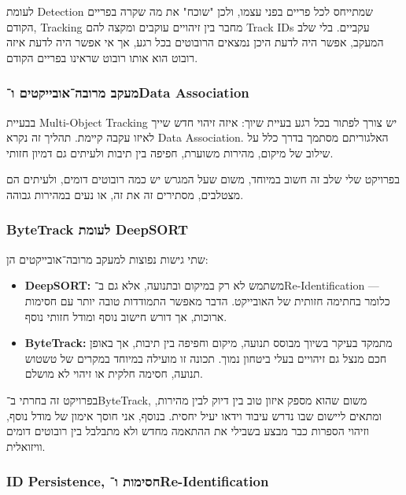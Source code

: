 לעומת \textenglish{Detection} שמתייחס לכל פריים בפני עצמו, ולכן "שוכח" את מה
שקרה בפריים הקודם, \textenglish{Tracking} מחבר בין זיהויים
עוקבים ומקצה להם \textenglish{Track IDs} עקביים. בלי שלב המעקב, אפשר
היה לדעת היכן נמצאים הרובוטים בכל רגע, אך אי אפשר היה לדעת איזה רובוט
הוא אותו רובוט שראינו בפריים הקודם.

\subsubsection{מעקב מרובה־אובייקטים ו־\textenglish{Data Association}}

בבעיית \textenglish{Multi-Object Tracking} יש צורך לפתור בכל רגע בעיית
שיוך: איזה זיהוי חדש שייך לאיזו עקבה קיימת. תהליך זה נקרא
\textenglish{Data Association}. האלגוריתם מסתמך בדרך כלל על שילוב של
מיקום, מהירות משוערת, חפיפה בין תיבות ולעיתים גם דמיון חזותי.

בפרויקט שלי שלב זה חשוב במיוחד, משום שעל המגרש יש כמה רובוטים דומים,
ולעיתים הם מצטלבים, מסתירים זה את זה, או נעים במהירות גבוהה.

\subsubsection{\textenglish{ByteTrack} לעומת \textenglish{DeepSORT}}

שתי גישות נפוצות למעקב מרובה־אובייקטים הן:
\begin{itemize}
\item \textbf{\textenglish{DeepSORT}:} משתמש לא רק במיקום ובתנועה, אלא
  גם ב־\textenglish{Re-Identification} — כלומר בחתימה חזותית של
  האובייקט.  הדבר מאפשר התמודדות טובה יותר עם חסימות ארוכות, אך דורש
  חישוב נוסף ומודל חזותי נוסף.
\item \textbf{\textenglish{ByteTrack}:} מתמקד בעיקר בשיוך מבוסס תנועה,
  מיקום וחפיפה בין תיבות, אך באופן חכם מנצל גם זיהויים בעלי ביטחון נמוך.
  תכונה זו מועילה במיוחד במקרים של טשטוש תנועה, חסימה חלקית או זיהוי לא
  מושלם.
\end{itemize}

בפרויקט זה בחרתי ב־\textenglish{ByteTrack}, משום שהוא מספק איזון טוב
בין דיוק לבין מהירות, ומתאים ליישום שבו נדרש עיבוד וידאו יעיל
יחסית. בנוסף, אני חוסך אימון של מודל נוסף, וזיהוי הספרות כבר מבצע
בשבילי את ההתאמה מחדש ולא מתבלבל בין רובוטים דומים וויזואלית.

\subsubsection{\textenglish{ID Persistence}, חסימות
  ו־\textenglish{Re-Identification}}

